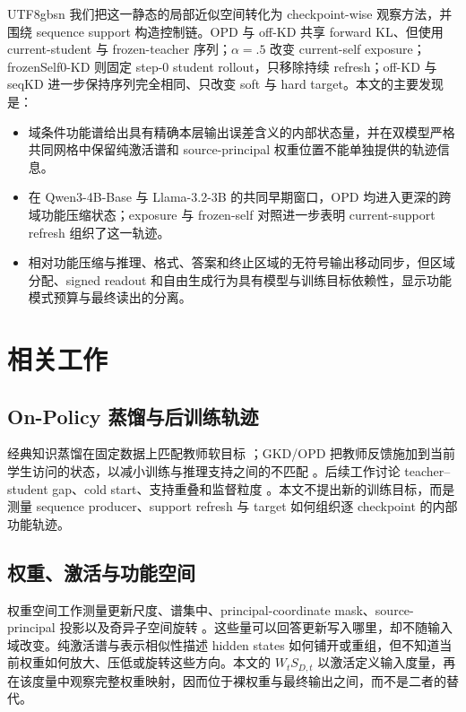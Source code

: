 \documentclass[letterpaper]{article} %
\begin{document}
\begin{CJK*}{UTF8}{gbsn}
我们把这一静态的局部近似空间转化为 checkpoint-wise 观察方法，并围绕 sequence support 构造控制链。OPD 与 off-KD 共享 forward KL、但使用 current-student 与 frozen-teacher 序列；$\alpha=.5$ 改变 current-self exposure；frozenSelf0-KD 则固定 step-0 student rollout，只移除持续 refresh；off-KD 与 seqKD 进一步保持序列完全相同、只改变 soft 与 hard target。本文的主要发现是：
\begin{itemize}
    \item 域条件功能谱给出具有精确本层输出误差含义的内部状态量，并在双模型严格共同网格中保留纯激活谱和 source-principal 权重位置不能单独提供的轨迹信息。
    \item 在 Qwen3-4B-Base 与 Llama-3.2-3B 的共同早期窗口，OPD 均进入更深的跨域功能压缩状态；exposure 与 frozen-self 对照进一步表明 current-support refresh 组织了这一轨迹。
    \item 相对功能压缩与推理、格式、答案和终止区域的无符号输出移动同步，但区域分配、signed readout 和自由生成行为具有模型与训练目标依赖性，显示功能模式预算与最终读出的分离。
\end{itemize}

\section{相关工作}

\subsection{On-Policy 蒸馏与后训练轨迹}

经典知识蒸馏在固定数据上匹配教师软目标 \citep{hinton2015distilling}；GKD/OPD 把教师反馈施加到当前学生访问的状态，以减小训练与推理支持之间的不匹配 \citep{agarwal2024opd}。后续工作讨论 teacher--student gap、cold start、支持重叠和监督粒度 \citep{li2026rethinkingopd,song2026surveyopd,yang2026oprd}。本文不提出新的训练目标，而是测量 sequence producer、support refresh 与 target 如何组织逐 checkpoint 的内部功能轨迹。

\subsection{权重、激活与功能空间}

权重空间工作测量更新尺度、谱集中、principal-coordinate mask、source-principal 投影以及奇异子空间旋转 \citep{zhu2025path,jin2025rlheals,yu2026dense}。这些量可以回答更新写入哪里，却不随输入域改变。纯激活谱与表示相似性描述 hidden states 如何铺开或重组，但不知道当前权重如何放大、压低或旋转这些方向。本文的 $W_tS_{D,t}$ 以激活定义输入度量，再在该度量中观察完整权重映射，因而位于裸权重与最终输出之间，而不是二者的替代。


\end{CJK*}
\end{document}
